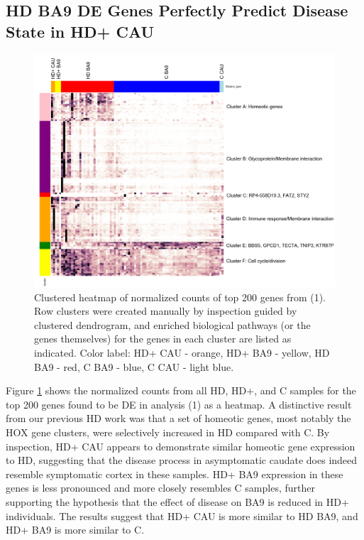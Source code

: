 \documentclass[fleqn,10pt,table]{wlscirep}
\begin{document}
\subsection{HD BA9 DE Genes Perfectly Predict Disease State in HD+ CAU}
\begin{figure}[ht]
\centering
\includegraphics[width=0.7\linewidth]{heatmap.png}
\caption{Clustered heatmap of normalized counts of top 200 genes from (1). Row clusters were created manually by inspection guided by clustered dendrogram, and enriched  biological pathways (or the genes themselves) for the genes in each cluster are listed as indicated. Color label: HD+ CAU - orange, HD+ BA9 - yellow, HD BA9 - red, C BA9 - blue, C CAU - light blue. \label{fig:de_gene_heatmap}}
\end{figure}

Figure \ref{fig:de_gene_heatmap} shows the normalized counts from all HD, HD+, and C samples for the top 200 genes found to be DE in analysis (1) as a heatmap.
A distinctive result from our previous HD work \cite{Labadorf2017-qb} was that a set of homeotic genes, most notably the HOX gene clusters, were selectively increased in HD compared with C.
By inspection, HD+ CAU appears to demonstrate similar homeotic gene expression to HD, suggesting that the disease process in asymptomatic caudate does indeed resemble symptomatic cortex in these samples.
HD+ BA9 expression in these genes is less pronounced and more closely resembles C samples, further supporting the hypothesis that the effect of disease on BA9 is reduced in HD+ individuals.
The results suggest that HD+ CAU is more similar to HD BA9, and HD+ BA9 is more similar to C.
\end{document}
